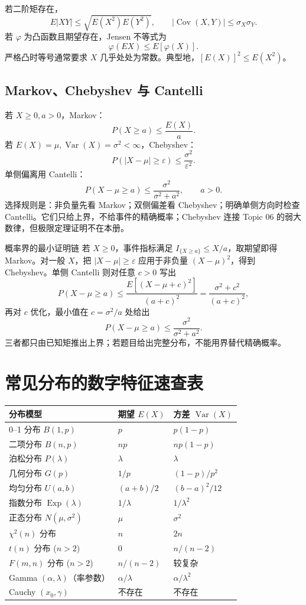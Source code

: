 \documentclass[11pt,a4paper]{ctexart}
\begin{document}
若二阶矩存在，
\[
E|XY|\leq\sqrt{E(X^2)E(Y^2)},\qquad |\operatorname{Cov}(X,Y)|\leq\sigma_X\sigma_Y.
\]
若 $\varphi$ 为凸函数且期望存在，Jensen 不等式为
\[
\boxed{\varphi(EX)\leq E[\varphi(X)]}.
\]
严格凸时等号通常要求 $X$ 几乎处处为常数。典型地，$[E(X)]^2\leq E(X^2)$。

\subsection{Markov、Chebyshev 与 Cantelli}

若 $X\geq0,a>0$，Markov：
\[
\boxed{P(X\geq a)\leq\frac{E(X)}a}.
\]
若 $E(X)=\mu,\operatorname{Var}(X)=\sigma^2<\infty$，Chebyshev：
\[
\boxed{P(|X-\mu|\geq\varepsilon)\leq\frac{\sigma^2}{\varepsilon^2}}.
\]
单侧偏离用 Cantelli：
\[
\boxed{P(X-\mu\geq a)\leq\frac{\sigma^2}{\sigma^2+a^2}},\qquad a>0.
\]
选择规则是：非负量先看 Markov；双侧偏差看 Chebyshev；明确单侧方向时检查 Cantelli。它们只给上界，不给事件的精确概率；Chebyshev 连接 Topic 06 的弱大数律，但极限定理证明不在本册。

\begin{methodbox}{概率界的最小证明链}
若 $X\ge0$，事件指标满足 $I_{\{X\ge a\}}\le X/a$，取期望即得 Markov。对一般 $X$，把 $|X-\mu|\ge\varepsilon$ 应用于非负量 $(X-\mu)^2$，得到 Chebyshev。单侧 Cantelli 则对任意 $c>0$ 写出
\[
P(X-\mu\ge a)\le\frac{E[(X-\mu+c)^2]}{(a+c)^2}
=\frac{\sigma^2+c^2}{(a+c)^2},
\]
再对 $c$ 优化，最小值在 $c=\sigma^2/a$ 处给出
\[
P(X-\mu\ge a)\le\frac{\sigma^2}{\sigma^2+a^2}.
\]
三者都只由已知矩推出上界；若题目给出完整分布，不能用界替代精确概率。
\end{methodbox}

\section{常见分布的数字特征速查表}

\begin{longtable}{L{3.5cm}L{4.0cm}L{4.5cm}}
\toprule
\textbf{分布模型} & \textbf{期望 $E(X)$} & \textbf{方差 $\operatorname{Var}(X)$}\\
--1 分布 $B(1,p)$ & $p$ & $p(1-p)$\\
二项分布 $B(n,p)$ & $np$ & $np(1-p)$\\
泊松分布 $P(\lambda)$ & $\lambda$ & $\lambda$\\
几何分布 $G(p)$ & $1/p$ & $(1-p)/p^2$\\
均匀分布 $U(a,b)$ & $(a+b)/2$ & $(b-a)^2/12$\\
指数分布 $\operatorname{Exp}(\lambda)$ & $1/\lambda$ & $1/\lambda^2$\\
正态分布 $N(\mu,\sigma^2)$ & $\mu$ & $\sigma^2$\\
$\chi^2(n)$ 分布 & $n$ & $2n$\\
$t(n)$ 分布 ($n>2$) & 0 & $n/(n-2)$\\
$F(m,n)$ 分布 ($n>2$) & $n/(n-2)$ & 较复杂\\
Gamma $(\alpha,\lambda)$（率参数） & $\alpha/\lambda$ & $\alpha/\lambda^2$\\
Cauchy $(x_0,\gamma)$ & 不存在 & 不存在\\
\bottomrule
\end{longtable}
\end{document}
